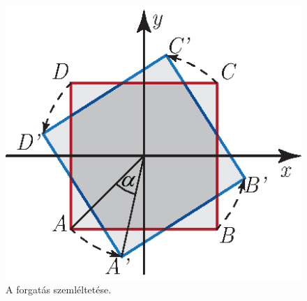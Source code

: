 \documentclass[12pt,a4paper]{scrartcl}
\begin{document}
\begin{figure}[htb] 
\centering    
\includegraphics[scale=1]{figs/forgatas.eps}
\caption{A forgatás szemléltetése.}
\label{fig:forgat}
\end{figure}
\end{document}
